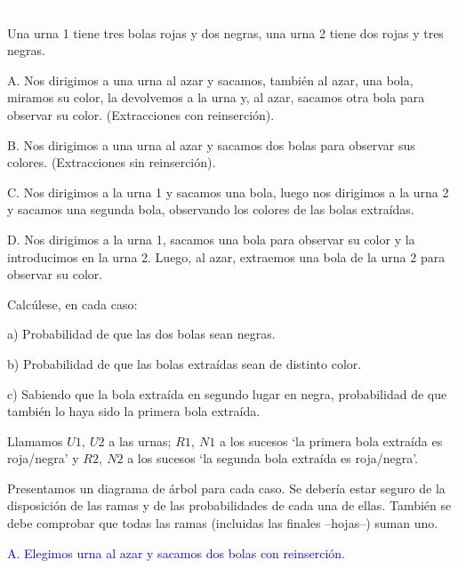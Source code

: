 \begin{ejemplo}
\begin{ejer}\textcolor{white}{.}

Una urna 1 tiene tres bolas rojas y dos negras, una urna 2 tiene dos rojas y tres negras.

\begin{adjustwidth}{10mm}{4mm}
A. Nos dirigimos a una urna al azar y sacamos, también al azar, una bola, miramos su color, la devolvemos a la urna y, al azar, sacamos otra bola para observar su color.	(Extracciones con reinserción).

B. Nos dirigimos a una urna al azar y sacamos dos bolas para observar sus colores. (Extracciones sin reinserción).

C. Nos dirigimos a la urna 1 y sacamos una bola, luego nos dirigimos a la urna 2 y sacamos una segunda bola, observando los colores de las bolas extraídas.

D. Nos dirigimos a la urna 1, sacamos una bola para observar su color y la introducimos en la urna 2. Luego, al azar, extraemos una bola de la urna 2 para observar su color.
\end{adjustwidth}


Calcúlese, en cada caso:

\begin{adjustwidth}{10mm}{4mm}
a) Probabilidad de que las dos bolas sean negras.

b) Probabilidad de que las bolas extraídas sean de distinto color.

c) Sabiendo que la bola extraída en segundo lugar en negra, probabilidad de que también lo haya sido la primera bola extraída.
\end{adjustwidth}	
\end{ejer}
\end{ejemplo}

\vspace{20mm}%
Llamamos $U1,\ U2$ a las urnas; $R1,\ N1$ a los sucesos `la primera bola extraída es roja/negra' y $R2,\ N2$ a los sucesos `la segunda bola extraída es roja/negra'.

Presentamos un diagrama de árbol para cada caso. Se debería estar seguro de la disposición de las ramas y de las probabilidades de cada una de ellas. También se debe comprobar que todas las ramas (incluidas las finales --hojas--) suman uno.




\vspace{40mm}%
\textcolor{blue}{A. Elegimos urna al azar y sacamos dos bolas con reinserción.}


